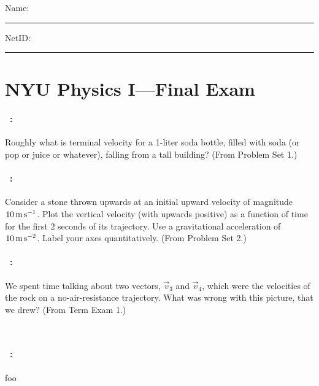 \documentclass[12pt]{article} 
\begin{document}
\noindent
Name: \rule[-1ex]{0.55\textwidth}{0.1pt}
NetID: \rule[-1ex]{0.2\textwidth}{0.1pt}

\section*{NYU Physics I---Final Exam}

\paragraph{\problemname~\theproblem:}%
Roughly what is terminal velocity for a 1-liter soda bottle, filled
with soda (or pop or juice or whatever), falling from a tall building?
(From Problem Set 1.)

\vfill

\paragraph{\problemname~\theproblem:}%
Consider a stone thrown upwards at an initial upward velocity of
magnitude $10\,\mathrm{m}\,\mathrm{s}^{-1}$. Plot the vertical velocity (with upwards
positive) as a function of time for the first 2 seconds of its
trajectory. Use a gravitational acceleration of $10\,\mathrm{m}\,\mathrm{s}^{-2}$. Label
your axes quantitatively.
(From Problem Set 2.)

\vfill

\paragraph{\problemname~\theproblem:}%
We spent time talking about two vectors, $\vec{v}_3$ and $\vec{v}_4$,
which were the velocities of the rock on a no-air-resistance trajectory.
What was wrong with this picture, that we drew?
(From Term Exam 1.)

\vfill
~
\clearpage

\paragraph{\problemname~\theproblem:}%
foo

\vfill
\end{document}
